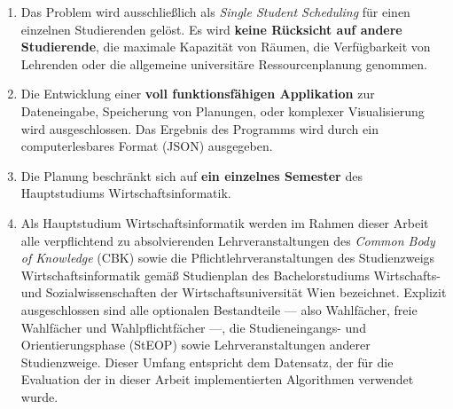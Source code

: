 \begin{enumerate}
  \item Das Problem wird ausschließlich als \textit{Single Student Scheduling} für einen einzelnen Studierenden gelöst. Es wird \textbf{keine Rücksicht auf andere Studierende}, die maximale Kapazität von Räumen, die Verfügbarkeit von Lehrenden oder die allgemeine universitäre Ressourcenplanung genommen.
  \item Die Entwicklung einer \textbf{voll funktionsfähigen Applikation} zur Dateneingabe, Speicherung von Planungen, oder komplexer Visualisierung wird ausgeschlossen. Das Ergebnis des Programms wird durch ein computerlesbares Format (JSON) ausgegeben.
  \item Die Planung beschränkt sich auf \textbf{ein einzelnes Semester} des Hauptstudiums Wirtschaftsinformatik.
  \item Als Hauptstudium Wirtschaftsinformatik werden im Rahmen dieser Arbeit alle verpflichtend zu absolvierenden Lehrveranstaltungen des \textit{Common Body of Knowledge} (CBK) sowie die Pflichtlehrveranstaltungen des Studienzweigs Wirtschaftsinformatik gemäß Studienplan des Bachelorstudiums Wirtschafts- und Sozialwissenschaften der Wirtschaftsuniversität Wien \cite[S. 13f]{wu-stupl} bezeichnet. Explizit ausgeschlossen sind alle optionalen Bestandteile --- also Wahlfächer, freie Wahlfächer und Wahlpflichtfächer ---, die Studieneingangs- und Orientierungsphase (StEOP) sowie Lehrveranstaltungen anderer Studienzweige. Dieser Umfang entspricht dem Datensatz, der für die Evaluation der in dieser Arbeit implementierten Algorithmen verwendet wurde.
\end{enumerate}
